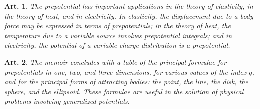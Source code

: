 \documentclass[12pt,a4paper]{article}
\theoremstyle{cayley}
\newtheorem{art}{Art.}[section]
\begin{document}
\begin{art}
The prepotential has important applications in the theory of elasticity, in the theory of heat, and in electricity. In elasticity, the displacement due to a body-force may be expressed in terms of prepotentials; in the theory of heat, the temperature due to a variable source involves prepotential integrals; and in electricity, the potential of a variable charge-distribution is a prepotential.
\end{art}

\begin{art}
The memoir concludes with a table of the principal formulae for prepotentials in one, two, and three dimensions, for various values of the index $q$, and for the principal forms of attracting bodies: the point, the line, the disk, the sphere, and the ellipsoid. These formulae are useful in the solution of physical problems involving generalized potentials.
\end{art}
\end{document}
